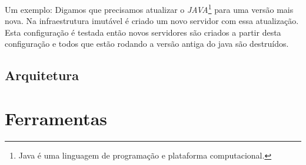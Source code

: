  Um exemplo: Digamos que precisamos atualizar o \textit{JAVA}\footnote{Java é uma linguagem de programação e plataforma computacional.} para uma versão mais nova. Na infraestrutura imutável é criado um novo servidor com essa atualização. Esta configuração é testada então novos servidores são criados a partir desta configuração e todos que estão rodando a versão antiga do java são destruídos. 
 

\subsection{Arquitetura}

 


\section{Ferramentas}

 
  
 


 